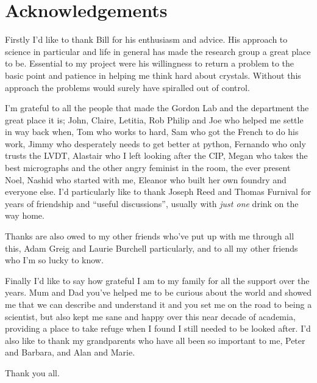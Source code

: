\clearpage

\doublespacing

\section*{Acknowledgements}


Firstly I'd like to thank Bill for his enthusiasm and advice. His approach to science in particular and life in general has made the research group a great place to be. Essential to my project were his willingness to return a problem to the basic point and patience in helping me think hard about crystals. Without this approach the problems would surely have spiralled out of control.


I'm grateful to all the people that made the Gordon Lab and the department the great place it is; John, Claire, Letitia, Rob Philip and Joe who helped me settle in way back when, Tom who works to hard, Sam who got the French to do his work, Jimmy who desperately needs to get better at python, Fernando who only trusts the LVDT, Alastair who I left looking after the CIP, Megan who takes the best micrographs and the other angry feminist in the room, the ever present Noel, Nashid who started with me, Eleanor who built her own foundry and everyone else. 
I'd particularly like to thank Joseph Reed and Thomas Furnival for years of friendship and ``useful discussions'', usually with \emph{just one} drink on the way home.

Thanks are also owed to my other friends who've put up with me through all this, Adam Greig and Laurie Burchell particularly, and to all my other friends who I'm so lucky to know.

Finally I'd like to say how grateful I am to my family for all the support over the years.
Mum and Dad you've helped me to be curious about the world and showed me that we can describe and understand it and you set me on the road to being a scientist, but also kept me sane and happy over this near decade of academia, providing a place to take refuge when I found I still needed to be looked after. I'd also like to thank my grandparents who have all been so important to me, Peter and Barbara, and Alan and Marie.


Thank you all.

























































